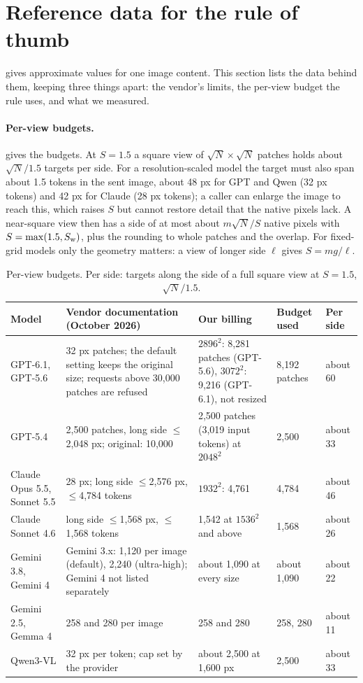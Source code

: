 \section{Reference data for the rule of thumb}
\label{sec:thumb}

 gives approximate values for one image content. This section lists the data behind them, keeping three things apart: the vendor's limits, the per-view budget the rule uses, and what we measured.

\paragraph{Per-view budgets.}  gives the budgets. At $S = 1.5$ a square view of $\sqrt N \times \sqrt N$ patches holds about $\sqrt N/1.5$ targets per side. For a resolution-scaled model the target must also span about 1.5 tokens in the sent image, about 48 px for GPT and Qwen (32 px tokens) and 42 px for Claude (28 px tokens); a caller can enlarge the image to reach this, which raises $S$ but cannot restore detail that the native pixels lack. A near-square view then has a side of at most about $m\sqrt N/S$ native pixels with $S = \max(1.5, S_{\mathrm{w}})$, plus the rounding to whole patches and the overlap. For fixed-grid models only the geometry matters: a view of longer side $\ell$ gives $S = mg/\ell$.

\begin{table}[t]
\centering
\footnotesize
\begin{tabular}{p{2.7cm}p{4.6cm}p{3.4cm}p{1.8cm}p{1.4cm}}
\toprule
Model & Vendor documentation (October 2026) & Our billing & Budget used & Per side \\
\midrule
GPT-6.1, GPT-5.6 & 32 px patches; the default setting keeps the original size; requests above 30{,}000 patches are refused & $2896^2$: 8{,}281 patches (GPT-5.6), $3072^2$: 9{,}216 (GPT-6.1), not resized & 8{,}192 patches & about 60 \\
GPT-5.4 & 2{,}500 patches, long side $\le$2{,}048 px; original: 10{,}000 & 2{,}500 patches (3{,}019 input tokens) at $2048^2$ & 2{,}500 & about 33 \\
Claude Opus 5.5, Sonnet 5.5 & 28 px; long side $\le$2{,}576 px, $\le$4{,}784 tokens & $1932^2$: 4{,}761 & 4{,}784 & about 46 \\
Claude Sonnet 4.6 & long side $\le$1{,}568 px, $\le$1{,}568 tokens & 1{,}542 at $1536^2$ and above & 1{,}568 & about 26 \\
Gemini 3.8, Gemini 4 & Gemini 3.x: 1{,}120 per image (default), 2{,}240 (ultra-high); Gemini 4 not listed separately & about 1{,}090 at every size & about 1{,}090 & about 22 \\
Gemini 2.5, Gemma 4 & 258 and 280 per image & 258 and 280 & 258, 280 & about 11 \\
Qwen3-VL & 32 px per token; cap set by the provider & about 2{,}500 at 1{,}600 px & 2{,}500 & about 33 \\
\bottomrule
\end{tabular}
\caption{Per-view budgets. Per side: targets along the side of a full square view at $S = 1.5$, $\sqrt N/1.5$.}
\label{tab:thumb-budget}
\end{table}

